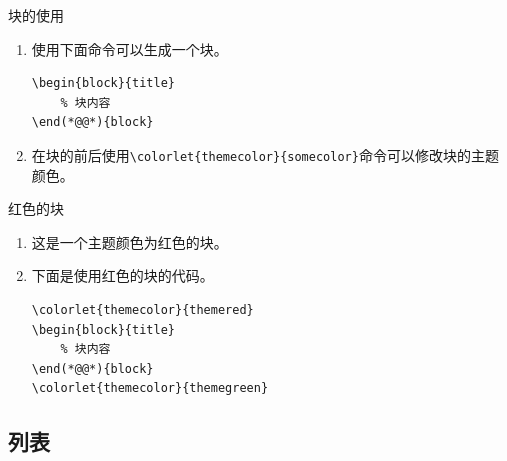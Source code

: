 \documentclass[8pt]{ctexbeamer}
\begin{document}
\begin{frame}[fragile]{\insertsection}{\insertsubsection}
    \begin{block}{块的使用}
        \begin{enumerate}
            \item 使用下面命令可以生成一个块。
            \begin{lstlisting}[style=latex]
\begin{block}{title}
    % 块内容
\end(*@@*){block}
            \end{lstlisting}
            \item 在块的前后使用\lstinline|\colorlet{themecolor}{somecolor}|命令可以修改块的主题颜色。
        \end{enumerate}
    \end{block}

    \begin{block}{红色的块}
        \begin{enumerate}
            \item 这是一个主题颜色为红色的块。
            \item 下面是使用红色的块的代码。
            \begin{lstlisting}[style=latex]
\colorlet{themecolor}{themered}
\begin{block}{title}
    % 块内容
\end(*@@*){block}
\colorlet{themecolor}{themegreen}
            \end{lstlisting}
        \end{enumerate}
    \end{block}

\end{frame}

\subsection{列表}
\end{document}
